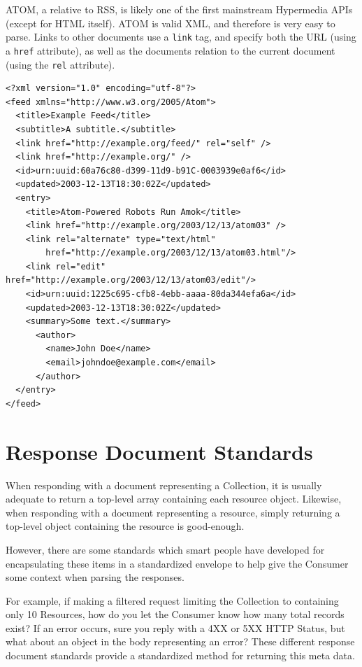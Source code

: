\documentclass{book}
\begin{document}
ATOM, a relative to RSS, is likely one of the first mainstream Hypermedia APIs (except for HTML itself). ATOM is valid XML, and therefore is very easy to parse. Links to other documents use a \texttt{link} tag, and specify both the URL (using a \texttt{href} attribute), as well as the documents relation to the current document (using the \texttt{rel} attribute).

\begin{verbatim}
<?xml version="1.0" encoding="utf-8"?>
<feed xmlns="http://www.w3.org/2005/Atom">
  <title>Example Feed</title>
  <subtitle>A subtitle.</subtitle>
  <link href="http://example.org/feed/" rel="self" />
  <link href="http://example.org/" />
  <id>urn:uuid:60a76c80-d399-11d9-b91C-0003939e0af6</id>
  <updated>2003-12-13T18:30:02Z</updated>
  <entry>
    <title>Atom-Powered Robots Run Amok</title>
    <link href="http://example.org/2003/12/13/atom03" />
    <link rel="alternate" type="text/html"
        href="http://example.org/2003/12/13/atom03.html"/>
    <link rel="edit" href="http://example.org/2003/12/13/atom03/edit"/>
    <id>urn:uuid:1225c695-cfb8-4ebb-aaaa-80da344efa6a</id>
    <updated>2003-12-13T18:30:02Z</updated>
    <summary>Some text.</summary>
      <author>
        <name>John Doe</name>
        <email>johndoe@example.com</email>
      </author>
  </entry>
</feed>
\end{verbatim}


\section{Response Document Standards}

When responding with a document representing a Collection, it is usually adequate to return a top-level array containing each resource object. Likewise, when responding with a document representing a resource, simply returning a top-level object containing the resource is good-enough.

However, there are some standards which smart people have developed for encapsulating these items in a standardized envelope to help give the Consumer some context when parsing the responses.

For example, if making a filtered request limiting the Collection to containing only 10 Resources, how do you let the Consumer know how many total records exist? If an error occurs, sure you reply with a 4XX or 5XX HTTP Status, but what about an object in the body representing an error? These different response document standards provide a standardized method for returning this meta data.
\end{document}
